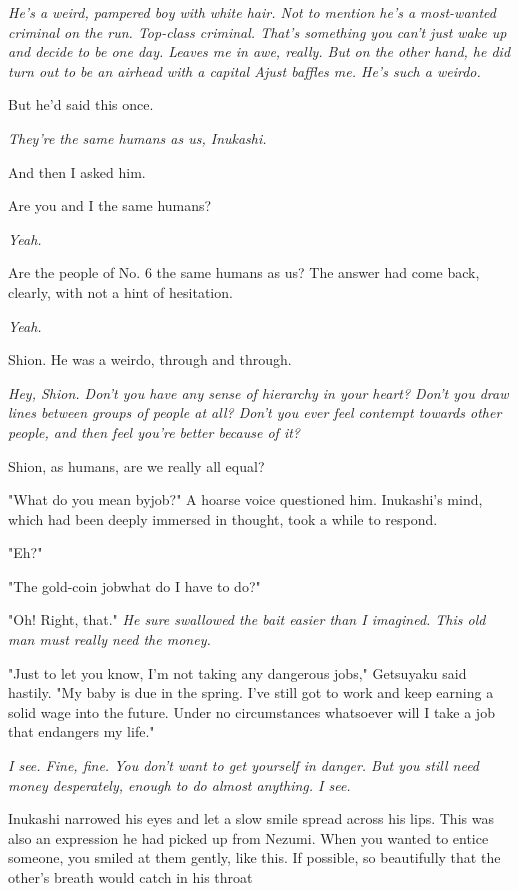 \emph{He's a weird, pampered boy with white hair. Not to mention he's a
most-wanted criminal on the run. Top-class criminal. That's something
you can't just wake up and decide to be one day. Leaves me in awe,
really. But on the other hand, he did turn out to be an airhead with a
capital A\el just baffles me. He's such a weirdo.}

But he'd said this once.

\emph{They're the same humans as us, Inukashi.}

And then I asked him.

Are you and I the same humans?

\emph{Yeah.}

Are the people of No. 6 the same humans as us? The answer had come back,
clearly, with not a hint of hesitation.

\emph{Yeah.}

Shion. He was a weirdo, through and through.

\emph{Hey, Shion. Don't you have any sense of hierarchy in your heart? Don't
you draw lines between groups of people at all? Don't you ever feel
contempt towards other people, and then feel you're better because of
it?}

Shion, as humans, are we really all equal?

"What do you mean by\el job?" A hoarse voice questioned him. Inukashi's
mind, which had been deeply immersed in thought, took a while to
respond.

"Eh?"

"The gold-coin job\el what do I have to do?"

"Oh! Right, that." \emph{He sure swallowed the bait easier than I imagined.
This old man must really need the money.}

"Just to let you know, I'm not taking any dangerous jobs," Getsuyaku
said hastily. "My baby is due in the spring. I've still got to work and
keep earning a solid wage into the future. Under no circumstances
whatsoever will I take a job that endangers my life."

\emph{I see. Fine, fine. You don't want to get yourself in danger. But you
still need money desperately, enough to do almost anything. I see.}

Inukashi narrowed his eyes and let a slow smile spread across his lips.
This was also an expression he had picked up from Nezumi. When you
wanted to entice someone, you smiled at them gently, like this. If
possible, so beautifully that the other's breath would catch in his
throat\el 


